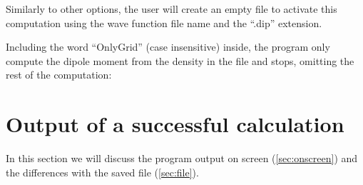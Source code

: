 \documentclass[a4paper,11pt,openany]{memoir}
\begin{document}
Similarly to other options, the user will create an empty file to activate this computation using the wave function file name and the ``.dip'' extension.

Including the word ``OnlyGrid'' (case insensitive) inside, the program only compute the dipole moment from the density in the file and stops, omitting the rest of the computation:

\chapter{Output of a successful calculation}\label{chap:output}
In this section we will discuss the program output on screen (\autoref{sec:onscreen}) and the differences with the saved file (\autoref{sec:file}).
\end{document}
